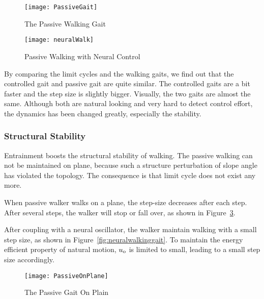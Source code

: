 \begin{figure}[!htbp]
  \begin{center}
     \texttt{[image: PassiveGait]}
    \caption{The Passive Walking Gait}
    \label{fig:passivegait}
\end{center}
\end{figure}

\begin{figure}[!htbp]
  \begin{center}
     \texttt{[image: neuralWalk]}
    \caption{Passive Walking with Neural Control}
    \label{fig:entrainmentgait}
\end{center}
\end{figure}

By comparing the limit cycles and the walking gaits, we find out that the controlled gait and passive gait are quite similar.
The controlled gaits are a bit faster and the step size is  slightly bigger.
Visually, the two gaits are almost the same.
Although both are natural looking and very hard to detect control effort, the dynamics has been changed greatly, especially the stability.



\subsubsection*{Structural Stability}
Entrainment boosts the structural stability of walking. 
The passive walking can not be maintained on plane, because such a structure perturbation of slope angle has violated the topology.
The consequence is that limit cycle does not exist any more.


When passive walker walks on a plane, the step-size decreases after each step.
After several steps, the walker will stop or fall over, as shown in Figure~\ref{fig:passivegaitplane}.

After coupling with a neural oscillator, the  walker maintain walking with a small step size, as shown in Figure~\ref{fig:neuralwalkinggait}.
To maintain the energy efficient property of natural motion, $u_{\mathrm{o}}$ is limited to small, leading to a small step size accordingly.

\begin{figure}[!htbp]
  \begin{center}
    \texttt{[image: PassiveOnPlane]}
    \caption{The Passive Gait On Plain}
    \label{fig:passivegaitplane}
\end{center}
\end{figure}

